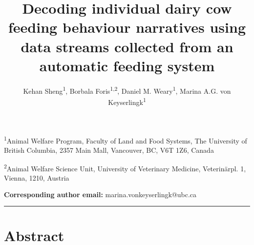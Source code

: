 \documentclass[
]{article}
\title{Decoding individual dairy cow feeding behaviour narratives using
data streams collected from an automatic feeding system}
\author{Kehan Sheng\textsuperscript{1}, Borbala
Foris\textsuperscript{1,2}, Daniel M. Weary\textsuperscript{1}, Marina
A.G. von Keyserlingk\textsuperscript{1}}
\date{}
\begin{document}
\maketitle


\textsuperscript{1}Animal Welfare Program, Faculty of Land and Food
Systems, The University of British Columbia, 2357 Main Mall, Vancouver,
BC, V6T 1Z6, Canada

\textsuperscript{2}Animal Welfare Science Unit, University of Veterinary
Medicine, Veterinärpl. 1, Vienna, 1210, Austria

\textbf{Corresponding author email:} marina.vonkeyserlingk@ubc.ca

\begin{center}\rule{0.5\linewidth}{0.5pt}\end{center}

\section{Abstract}\label{abstract}
\end{document}
